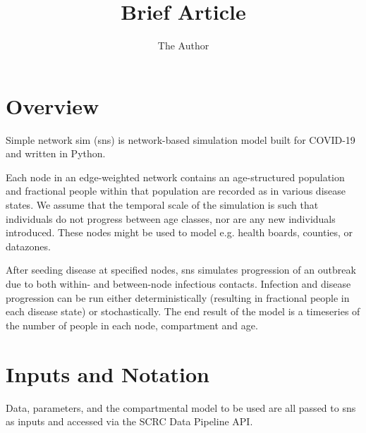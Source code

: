 \documentclass[11pt]{article}
\title{Brief Article}
\author{The Author}
\begin{document}
\section{Overview}

Simple network sim (sns) is network-based simulation model built for COVID-19 and written in Python.

Each node in an edge-weighted network contains an age-structured population and fractional people within that population are recorded as in various disease states. We assume that the temporal scale of the simulation is such that individuals do not progress between age classes, nor are any new individuals introduced. These nodes might be used to model e.g. health boards, counties, or datazones.  

After seeding disease at specified nodes, sns simulates progression of an outbreak due to both within- and between-node infectious contacts.  Infection and disease progression can be run either deterministically (resulting in fractional people in each disease state) or stochastically.  The end result of the model is a timeseries of the number of people in each node, compartment and age.

\section{Inputs and Notation}

Data, parameters, and the compartmental model to be used are all passed to sns as inputs and accessed via the SCRC Data Pipeline API.  
\end{document}
